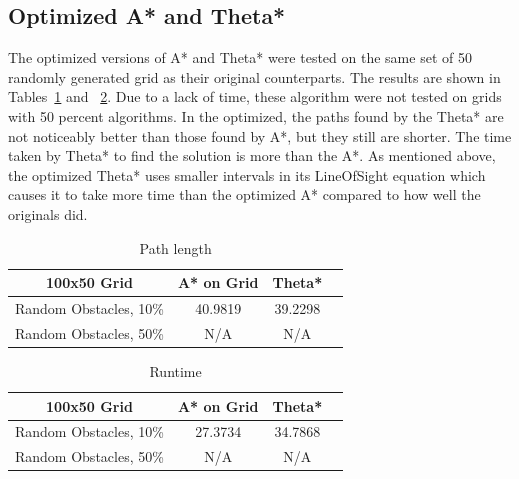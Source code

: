 \documentclass[a4paper,11pt]{report}
\begin{document}
\subsection{Optimized A* and Theta*}
The optimized versions of A* and Theta* were tested on the same set of 50 randomly generated grid as their original counterparts. The results are shown in Tables~\ref{table:optimized_path_lengths} and ~\ref{table:optimized_runtimes}. Due to a lack of time, these algorithm were not tested on grids with 50 percent algorithms. In the optimized, the paths found by the Theta* are not noticeably better than those found by A*, but they still are shorter. The time taken by Theta* to find the solution is more than the A*. As mentioned above, the optimized Theta* uses smaller intervals in its LineOfSight equation which causes it to take more time than the optimized A* compared to how well the originals did. 

\begin{table}[h!]
   \centering
   \begin{tabular}{ | c | c |c |c | }

      \hline
      \textbf{100x50 Grid} & \textbf{A* on Grid} & \textbf{Theta*}  \\ \hline
      Random Obstacles, 10\% & 40.9819 & 39.2298\\ \hline
      Random Obstacles, 50\% & N/A & N/A \\ \hline

   \end{tabular}

   \caption{Path length}
   \label{table:optimized_path_lengths}
\end{table}


\begin{table}[h!]
   \centering
   \begin{tabular}{ | c | c |c |c | }

      \hline
      \textbf{100x50 Grid} & \textbf{A* on Grid} & \textbf{Theta*} \\ \hline
      Random Obstacles, 10\% & 27.3734 & 34.7868  \\ \hline
      Random Obstacles, 50\% & N/A & N/A \\ \hline

   \end{tabular}

   \caption{Runtime}
   \label{table:optimized_runtimes}
\end{table}
\end{document}
